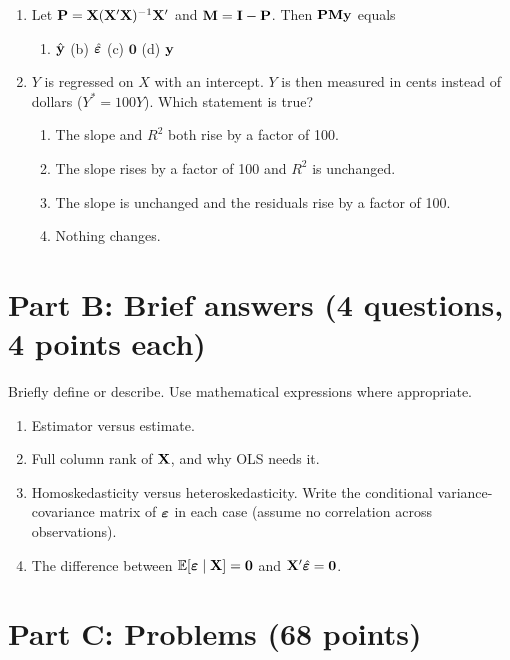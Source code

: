 \documentclass[11pt]{article}
\begin{document}
\begin{enumerate}[label=\textbf{A\arabic*.},leftmargin=*]
\item Let $\mathbf{P}=\mathbf{X}(\mathbf{X}'\mathbf{X})^{-1}\mathbf{X}'$ and $\mathbf{M}=\mathbf{I}-\mathbf{P}$. Then $\mathbf{P}\mathbf{M}\mathbf{y}$ equals
  \begin{enumerate}[label=(\alph*)]
  \item $\hat{\mathbf{y}}$ \quad (b) $\hat{\bm{\varepsilon}}$ \quad (c) $\mathbf0$ \quad (d) $\mathbf{y}$
  \end{enumerate}

\item $Y$ is regressed on $X$ with an intercept. $Y$ is then measured in cents instead of dollars ($Y^*=100Y$). Which statement is true?
  \begin{enumerate}[label=(\alph*)]
  \item The slope and $R^2$ both rise by a factor of 100.
  \item The slope rises by a factor of 100 and $R^2$ is unchanged.
  \item The slope is unchanged and the residuals rise by a factor of 100.
  \item Nothing changes.
  \end{enumerate}
\end{enumerate}

\section{Part B: Brief answers (4 questions, 4 points each)}

Briefly define or describe. Use mathematical expressions where appropriate.

\begin{enumerate}[label=\textbf{B\arabic*.},leftmargin=*]
\item Estimator versus estimate.
\item Full column rank of $\mathbf{X}$, and why OLS needs it.
\item Homoskedasticity versus heteroskedasticity. Write the conditional variance-covariance matrix of $\bm{\varepsilon}$ in each case (assume no correlation across observations).
\item The difference between $\mathbb{E}[\bm{\varepsilon}\mid\mathbf{X}]=\mathbf0$ and $\mathbf{X}'\hat{\bm{\varepsilon}}=\mathbf0$.
\end{enumerate}

\section{Part C: Problems (68 points)}
\end{document}
